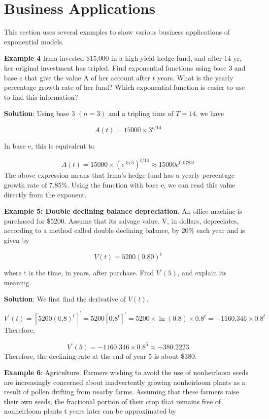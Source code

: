 \documentclass[
]{book}
\begin{document}
\hfill\break

\hypertarget{business-applications}{%
\section{Business Applications}\label{business-applications}}

This section uses several examples to show various business applications of exponential models.

\textbf{Example 4} Irma invested \$15,000 in a high-yield hedge fund, and after 14 yr, her original investment has tripled. Find exponential functions using base 3 and base e that give the value A of her account after \(t\) years. What is the yearly percentage growth rate of her fund? Which exponential function is easier to use to find this information?

\textbf{Solution}: Using base 3 \((n = 3)\) and a tripling time of \(T = 14\), we have

\[
A(t) = 15000\times 3^{t/14}
\]

In base e, this is equivalent to

\[
A(t) = 15000\times(e^{\ln3})^{t/14} \approx 15000 e^{0.0785t}
\]
The above expression means that Irma's hedge fund has a yearly percentage growth rate of 7.85\%. Using the function with base e, we can read this value directly from the exponent.

\textbf{Example 5: Double declining balance depreciation}. An office machine is purchased for \$5200. Assume that its salvage value, V, in dollars, depreciates, according to a method called double declining balance, by 20\% each year and is given by

\[
V(t) = 5200(0.80)^t
\]

where t is the time, in years, after purchase. Find \(V^\prime(5)\), and explain its meaning.

\textbf{Solution}: We first find the derivative of \(V(t)\).

\[
V^\prime(t) = [5200(0.8)^t]^\prime = 5200[0.8^t]^\prime = 5200\times \ln(0.8)\times 0.8^t = -1160.346\times 0.8^t
\]
Therefore,

\[
V^\prime(5) = -1160.346\times 0.8^5 \approx -380.2223
\]
Therefore, the declining rate at the end of year 5 is about \(\$380\).

\hfill\break

\textbf{Example 6}: Agriculture. Farmers wishing to avoid the use of nonheirloom seeds are increasingly concerned about inadvertently growing nonheirloom plants as a result of pollen drifting from nearby farms. Assuming that these farmers raise their own seeds, the fractional portion of their crop that remains free of nonheirloom plants t years later can be approximated by
\end{document}
